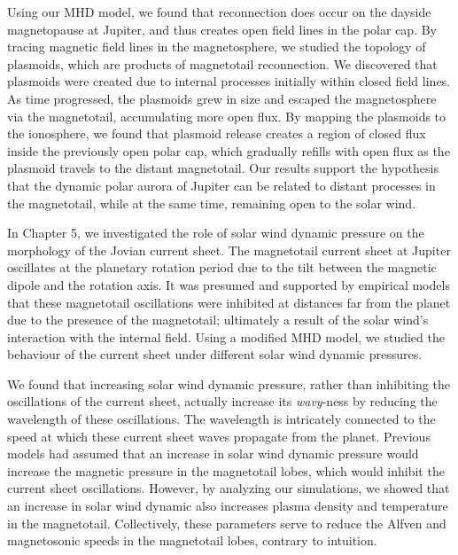 Using our MHD model, we found that reconnection does occur on the dayside magnetopause at Jupiter, and thus creates open field lines in the polar cap. By tracing magnetic field lines in the magnetosphere, we studied the topology of plasmoids, which are products of magnetotail reconnection. We discovered that plasmoids were created due to internal processes initially within closed field lines. As time progressed, the plasmoids grew in size and escaped the magnetosphere via the magnetotail, accumulating more open flux. By mapping the plasmoids to the ionosphere, we found that plasmoid release creates a region of closed flux inside the previously open polar cap, which gradually refills with open flux as the plasmoid travels to the distant magnetotail. Our results support the hypothesis that the dynamic polar aurora of Jupiter can be related to distant processes in the magnetotail, while at the same time, remaining open to the solar wind. 

In Chapter 5, we investigated the role of solar wind dynamic pressure on the morphology of the Jovian current sheet. The magnetotail current sheet at Jupiter oscillates at the planetary rotation period due to the tilt between the magnetic dipole and the rotation axis. It was presumed and supported by empirical models that these magnetotail oscillations were inhibited at distances far from the planet due to the presence of the magnetotail; ultimately a result of the solar wind's interaction with the internal field. Using a modified MHD model, we studied the behaviour of the current sheet under different solar wind dynamic pressures. 

We found that increasing solar wind dynamic pressure, rather than inhibiting the oscillations of the current sheet, actually increase its \emph{wavy}-ness by reducing the wavelength of these oscillations. The wavelength is intricately connected to the speed at which these current sheet waves propagate from the planet. Previous models had assumed that an increase in solar wind dynamic pressure would increase the magnetic pressure in the magnetotail lobes, which would inhibit the current sheet oscillations. However, by analyzing our simulations, we showed that an increase in solar wind dynamic also increases plasma density and temperature in the magnetotail. Collectively, these parameters serve to reduce the Alfven and magnetosonic speeds in the magnetotail lobes, contrary to intuition.


